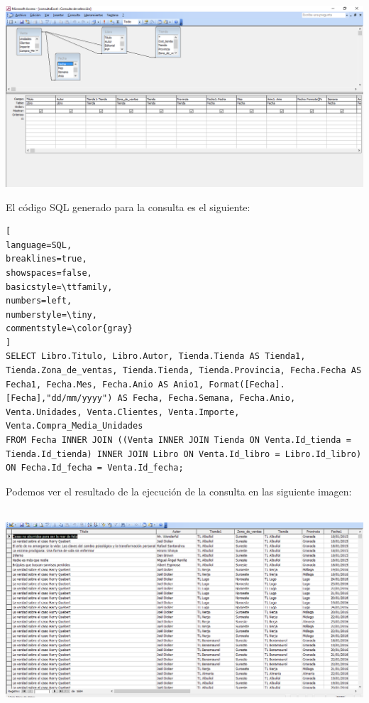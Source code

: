 \documentclass[paper=a4, fontsize=11pt, spanish]{scrartcl}
\numberwithin{equation}{section} %
\numberwithin{figure}{section} %
\numberwithin{table}{section} %
\begin{document}
\begin{center}
	\includegraphics[scale=0.5]{img5.png}
\end{center}
El código SQL generado para la consulta es el siguiente:
\begin{lstlisting}[
language=SQL,
breaklines=true,
showspaces=false,
basicstyle=\ttfamily,
numbers=left,
numberstyle=\tiny,
commentstyle=\color{gray}
]
SELECT Libro.Titulo, Libro.Autor, Tienda.Tienda AS Tienda1, Tienda.Zona_de_ventas, Tienda.Tienda, Tienda.Provincia, Fecha.Fecha AS Fecha1, Fecha.Mes, Fecha.Anio AS Anio1, Format([Fecha].[Fecha],"dd/mm/yyyy") AS Fecha, Fecha.Semana, Fecha.Anio, Venta.Unidades, Venta.Clientes, Venta.Importe, Venta.Compra_Media_Unidades
FROM Fecha INNER JOIN ((Venta INNER JOIN Tienda ON Venta.Id_tienda = Tienda.Id_tienda) INNER JOIN Libro ON Venta.Id_libro = Libro.Id_libro) ON Fecha.Id_fecha = Venta.Id_fecha;
\end{lstlisting}
Podemos ver el resultado de la ejecución de la consulta en las siguiente imagen:\\
\\
\begin{center}
	\includegraphics[scale=0.5]{img6.png}
\end{center}
\end{document}
